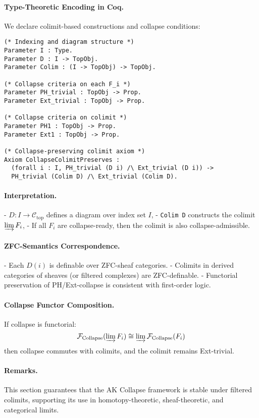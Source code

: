 \documentclass[11pt]{article}
\begin{document}
{\paragraph{Type-Theoretic Encoding in Coq.}

We declare colimit-based constructions and collapse conditions:

\begin{lstlisting}[language=Coq]
(* Indexing and diagram structure *)
Parameter I : Type.
Parameter D : I -> TopObj.
Parameter Colim : (I -> TopObj) -> TopObj.

(* Collapse criteria on each F_i *)
Parameter PH_trivial : TopObj -> Prop.
Parameter Ext_trivial : TopObj -> Prop.

(* Collapse criteria on colimit *)
Parameter PH1 : TopObj -> Prop.
Parameter Ext1 : TopObj -> Prop.

(* Collapse-preserving colimit axiom *)
Axiom CollapseColimitPreserves :
  (forall i : I, PH_trivial (D i) /\ Ext_trivial (D i)) ->
  PH_trivial (Colim D) /\ Ext_trivial (Colim D).
\end{lstlisting}

\paragraph{Interpretation.}
- \( D : I \to \mathcal{C}_{\mathrm{top}} \) defines a diagram over index set \( I \),
- \texttt{Colim D} constructs the colimit \( \varinjlim F_i \),
- If all \( F_i \) are collapse-ready, then the colimit is also collapse-admissible.

\paragraph{ZFC-Semantics Correspondence.}
- Each \( D(i) \) is definable over ZFC-sheaf categories.
- Colimits in derived categories of sheaves (or filtered complexes) are ZFC-definable.
- Functorial preservation of PH/Ext-collapse is consistent with first-order logic.

\paragraph{Collapse Functor Composition.}
If collapse is functorial:
\[
\mathcal{F}_{\text{Collapse}}(\varinjlim F_i) \cong \varinjlim \mathcal{F}_{\text{Collapse}}(F_i)
\]
then collapse commutes with colimits, and the colimit remains Ext-trivial.

\paragraph{Remarks.}
This section guarantees that the AK Collapse framework is stable under filtered colimits,  
supporting its use in homotopy-theoretic, sheaf-theoretic, and categorical limits.

}
\end{document}
